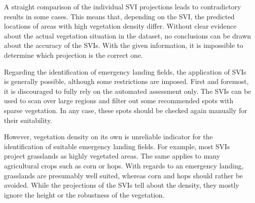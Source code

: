 A straight comparison of the individual SVI projections leads to contradictory results in some cases. This means that, depending on the SVI, the predicted locations of areas with high vegetation density differ. Without clear evidence about the actual vegetation situation in the dataset, no conclusions can be drawn about the accuracy of the SVIs. With the given information, it is impossible to determine which projection is the correct one.

Regarding the identification of emergency landing fields, the application of SVIs is generally possible, although some restrictions are imposed. First and foremost, it is discouraged to fully rely on the automated assessment only. The SVIs can be used to scan over large regions and filter out some recommended spots with sparse vegetation. In any case, these spots should be checked again manually for their suitability.

However, vegetation density on its own is unreliable indicator for the identification of suitable emergency landing fields. For example, most SVIs project grasslands as highly vegetated areas. The same applies to many agricultural crops such as corn or hops. With regards to an emergency landing, grasslands are presumably well suited, whereas corn and hops should rather be avoided. While the projections of the SVIs tell about the density, they mostly ignore the height or the robustness of the vegetation.

\clearpage
